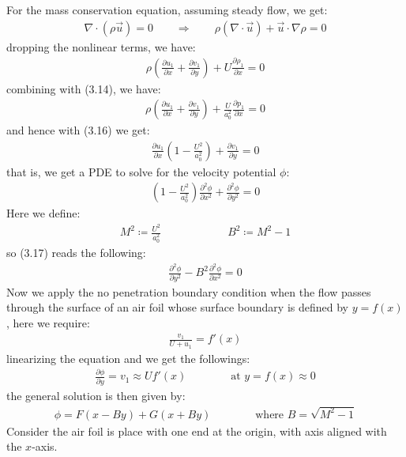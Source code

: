 \documentclass[11pt]{book}
\theoremstyle{break}
\theoremstyle{break}
\begin{document}
For the mass conservation equation, assuming steady flow, we get:
\begin{align*}
\nabla\cdot (\rho \vec{u}) = 0 \qquad \Rightarrow \qquad \rho (\nabla \cdot \vec{u})+ \vec{u}\cdot \nabla \rho = 0
\end{align*}
dropping the nonlinear terms, we have:
\begin{align*}
\rho\left(\frac{\partial u_1}{\partial x} + \frac{\partial v_1}{\partial y}\right) + U \frac{\partial \rho_1}{\partial x} = 0 
\end{align*}
combining with (3.14), we have:
\begin{align*}
\rho\left(\frac{\partial u_1}{\partial x} + \frac{\partial v_1}{\partial y}\right) + \frac{U}{a_0^2} \frac{\partial p_1}{\partial x} = 0
\end{align*}
and hence with (3.16) we get:
\begin{align*}
\frac{\partial u_1}{\partial x}\left( 1 - \frac{U^2}{a_0^2}\right) + \frac{\partial v_1}{\partial y} = 0
\end{align*}
that is, we get a PDE to solve for the velocity potential $\phi$:
\begin{align}
\left( 1 - \frac{U^2}{a_0^2}\right) \frac{\partial^2 \phi}{\partial x^2} + \frac{\partial^2 \phi}{\partial y^2} = 0
\end{align}
Here we define:
\begin{align*}
M^2 \coloneqq \frac{U^2}{a_0^2} \qquad\qquad\qquad B^2 \coloneqq M^2 - 1
\end{align*}
so (3.17) reads the following:
\begin{align}
\frac{\partial^2 \phi}{\partial y^2} - B^2 \frac{\partial^2 \phi}{\partial x^2} = 0
\end{align}
Now we apply the no penetration boundary condition when the flow passes through the surface of an air foil whose surface boundary is defined by $y = f(x)$, here we require:
\begin{align*}
\frac{v_1}{U + u_1} = f'(x)
\end{align*}
linearizing the equation and we get the followings:
\begin{align*}
\frac{\partial \phi}{\partial y} = v_1 \approx U f'(x) \qquad\qquad \text{at } y=f(x) \approx 0
\end{align*}
the general solution is then given by:
\begin{align*}
\phi = F(x-By) + G(x+By)\qquad\qquad\text{where }B = \sqrt{M^2 - 1}
\end{align*}
Consider the air foil is place with one end at the origin, with axis aligned with the $x$-axis.\\
\end{document}
